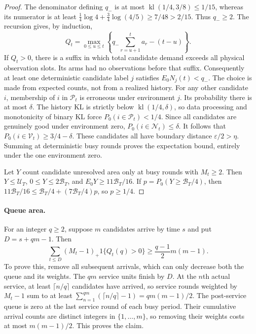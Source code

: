 \begin{proof}
The denominator defining $q_-$ is at most
$\operatorname{kl}(1/4,3/8)\le1/15$, whereas its numerator is at least
$\frac14\log4+\frac34\log(4/5)\ge7/48>2/15$. Thus $q_-\ge2$.
The recursion gives, by induction,
\[
 Q_t=\max_{0\le u\le t}\left\{
       q_-\sum_{r=u+1}^ta_r-(t-u)\right\}.
\]
If $Q_t>0$, there is a suffix in which total candidate demand exceeds all
physical observation slots. Its arms had no observations before that suffix.
Consequently at least one deterministic candidate label $j$ satisfies
$E_0N_j(t)<q_-$. The choice is made from expected counts, not from a realized
history. For any other candidate $i$, membership of $i$ in $\mathcal P_t$ is erroneous
under environment $j$. Its probability there is at most $\delta$.
The history KL is strictly below $\operatorname{kl}(1/4,\delta)$, so data
processing and monotonicity of binary KL force $P_0(i\in \mathcal P_t)<1/4$.
Since all candidates are genuinely good under environment zero,
$P_0(i\in \mathcal N_t)\le\delta$. It follows that
$P_0(i\in \mathcal V_t)\ge3/4-\delta$. These candidates all have boundary distance
$\varepsilon/2>\eta$. Summing at deterministic busy rounds proves the
expectation bound, entirely under the one environment zero.

Let $Y$ count candidate unresolved area only at busy rounds with $M_t\ge2$.
Then $Y\le\mathcal U_T$, $0\le Y\le2\mathcal B_T$, and
$E_0Y\ge11\mathcal B_T/16$. If
$p=P_0(Y\ge\mathcal B_T/4)$, then
$11\mathcal B_T/16\le\mathcal B_T/4+(7\mathcal B_T/4)p$, so $p\ge1/4$.
\end{proof}

\paragraph{Queue area.}
For an integer $q\ge2$, suppose $m$ candidates arrive by time $s$ and put
$D=s+qm-1$. Then
\[
 \sum_{t\le D}(M_t-1)_+1\{Q_t(q)>0\}
 \ge\frac{q-1}{2}m(m-1).
\]
To prove this, remove all subsequent arrivals, which can only decrease both
the queue and its weights. The $qm$ service units finish by $D$. At the
$n$th actual service, at least $\lceil n/q\rceil$ candidates have arrived,
so service rounds weighted by $M_t-1$ sum to at least
$\sum_{n=1}^{qm}(\lceil n/q\rceil-1)=qm(m-1)/2$.
The post-service queue is zero at the last service round of each busy period.
Their cumulative arrival counts are distinct integers in $\{1,\ldots,m\}$,
so removing their weights costs at most $m(m-1)/2$. This proves the claim.

